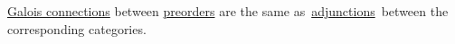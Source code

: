 \hyperref[D1.95]{Galois connections} between \hyperref[D1.30]{preorders} are the same as \,\hyperref[D3.70]{adjunctions}\, between the corresponding categories.
